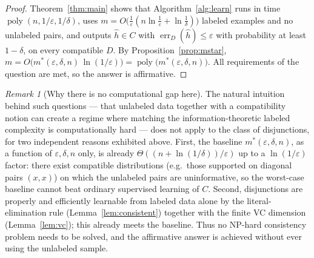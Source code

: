 \documentclass{amsart}
\theoremstyle{definition}
\theoremstyle{remark}
\newtheorem{remark}{Remark}
\newcommand{\eps}{\varepsilon}
\DeclareMathOperator*{\err}{err}
\DeclareMathOperator{\poly}{poly}
\begin{document}
\begin{proof}
Theorem~\ref{thm:main} shows that Algorithm~\ref{alg:learn} runs in time
$\poly(n,1/\eps,1/\delta)$, uses
$m=O\big(\tfrac1\eps(n\ln\tfrac1\eps+\ln\tfrac1\delta)\big)$ labeled examples and
no unlabeled pairs, and outputs $\hat h\in C$ with $\err_D(\hat h)\le\eps$ with
probability at least $1-\delta$, on every compatible $D$. By
Proposition~\ref{prop:mstar}, $m=O\big(m^*(\eps,\delta,n)\,\ln(1/\eps)\big)
=\poly\big(m^*(\eps,\delta,n)\big)$. All requirements of the question are met, so
the answer is affirmative.
\end{proof}

\begin{remark}[Why there is no computational gap here]
The natural intuition behind such questions --- that unlabeled data together with
a compatibility notion can create a regime where matching the
information-theoretic labeled complexity is computationally hard --- does not
apply to the class of disjunctions, for two independent reasons exhibited above.
First, the baseline $m^*(\eps,\delta,n)$, as a function of $\eps,\delta,n$ only,
is already $\Theta((n+\ln(1/\delta))/\eps)$ up to a $\ln(1/\eps)$ factor: there
exist compatible distributions (e.g.\ those supported on diagonal pairs $(x,x)$)
on which the unlabeled pairs are uninformative, so the worst-case baseline cannot
beat ordinary supervised learning of $C$. Second, disjunctions are properly and
efficiently learnable from labeled data alone by the literal-elimination rule
(Lemma~\ref{lem:consistent}) together with the finite VC dimension
(Lemma~\ref{lem:vc}); this already meets the baseline. Thus no NP-hard
consistency problem needs to be solved, and the affirmative answer is achieved
without ever using the unlabeled sample.
\end{remark}
\end{document}
